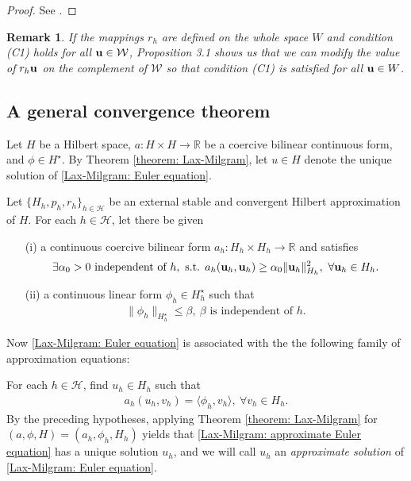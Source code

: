 \documentclass[oneside,11pt]{book}
\numberwithin{equation}{section}
\newtheorem{remark}{Remark}[section]
\begin{document}
\begin{proof}
    See \cite[p. 30]{Temam2000}.
\end{proof}

\begin{remark}
    If the mappings $r_h$ are defined on the whole space $W$ and condition (C1) holds for all ${\bf u}\in\mathcal{W}$, Proposition 3.1 shows us that we can modify the value of $r_h{\bf u}$ on the complement of $\mathcal{W}$ so that condition (C1) is satisfied for all ${\bf u}\in W$.
\end{remark}

\subsection{A general convergence theorem}
Let $H$ be a Hilbert space, $a:H\times H\to\mathbb{R}$ be a coercive bilinear continuous form, and $\phi\in H^\star$. By Theorem \ref{theorem: Lax-Milgram}, let $u\in H$ denote the unique solution of \eqref{Lax-Milgram: Euler equation}.

Let $\{H_h,p_h,r_h\}_{h\in\mathcal{H}}$ be an external stable and convergent Hilbert approximation of $H$. For each $h\in\mathcal{H}$, let there be given
\begin{itemize}
    \item[(i)] a continuous coercive bilinear form $a_h:H_h\times H_h\to\mathbb{R}$ and satisfies
    \begin{align}
        \label{uniform coerciveness}
        \exists\alpha_0 > 0\mbox{ independent of } h,\mbox{ s.t. } a_h({\bf u}_h,{\bf u}_h)\ge\alpha_0\|{\bf u}_h\|_{H_h}^2,\ \forall{\bf u}_h\in H_h.
    \end{align}
    \item[(ii)] a continuous linear form $\phi_h\in H_h^\star$ such that
    \begin{align}
        \label{uniform bound of linear forms}
        \|\phi_h\|_{H_h^\star}\le\beta,\ \beta\mbox{ is independent of } h.
    \end{align}
\end{itemize}
Now \eqref{Lax-Milgram: Euler equation} is associated with the the following family of approximation equations:

For each $h\in\mathcal{H}$, find $u_h\in H_h$ such that
\begin{align}
    \label{Lax-Milgram: approximate Euler equation}
    a_h(u_h,v_h) = \langle\phi_h,v_h\rangle,\ \forall v_h\in H_h.
\end{align}
By the preceding hypotheses, applying Theorem \ref{theorem: Lax-Milgram} for $(a,\phi,H) = (a_h,\phi_h,H_h)$ yields that \eqref{Lax-Milgram: approximate Euler equation} has a unique solution $u_h$, and we will call $u_h$ an \textit{approximate solution} of \eqref{Lax-Milgram: Euler equation}.
\end{document}
